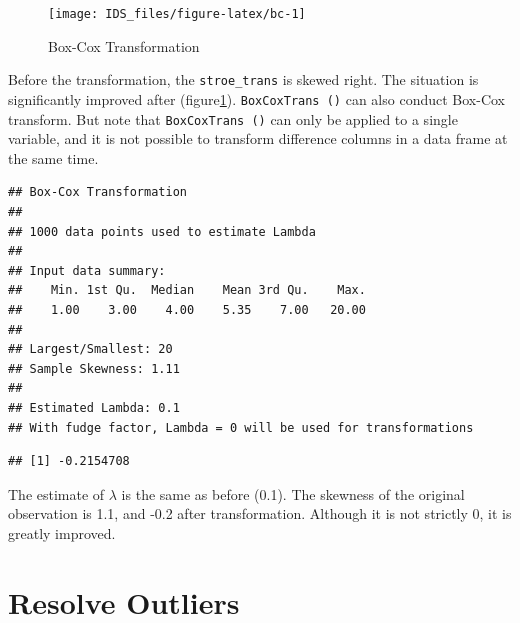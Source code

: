 \documentclass[12pt,]{krantz}
\newenvironment{Shaded}{\begin{snugshade}}{\end{snugshade}}
\newcommand{\KeywordTok}[1]{\textcolor[rgb]{0.13,0.29,0.53}{\textbf{{#1}}}}
\newcommand{\NormalTok}[1]{{#1}}
\theoremstyle{definition}
\theoremstyle{definition}
\theoremstyle{remark}
\begin{document}
\begin{figure}

{\centering \texttt{[image: IDS\_files/figure-latex/bc-1]} 

}

\caption{Box-Cox Transformation}\label{fig:bc}
\end{figure}

Before the transformation, the \texttt{stroe\_trans} is skewed right.
The situation is significantly improved after (figure\ref{fig:bc}).
\texttt{BoxCoxTrans\ ()} can also conduct Box-Cox transform. But note
that \texttt{BoxCoxTrans\ ()} can only be applied to a single variable,
and it is not possible to transform difference columns in a data frame
at the same time.

\begin{Shaded}
\end{Shaded}

\begin{verbatim}
## Box-Cox Transformation
## 
## 1000 data points used to estimate Lambda
## 
## Input data summary:
##    Min. 1st Qu.  Median    Mean 3rd Qu.    Max. 
##    1.00    3.00    4.00    5.35    7.00   20.00 
## 
## Largest/Smallest: 20 
## Sample Skewness: 1.11 
## 
## Estimated Lambda: 0.1 
## With fudge factor, Lambda = 0 will be used for transformations
\end{verbatim}

\begin{Shaded}
\end{Shaded}

\begin{verbatim}
## [1] -0.2154708
\end{verbatim}

The estimate of \(\lambda\) is the same as before (0.1). The skewness of
the original observation is 1.1, and -0.2 after transformation. Although
it is not strictly 0, it is greatly improved.

\section{Resolve Outliers}\label{resolve-outliers}
\end{document}
